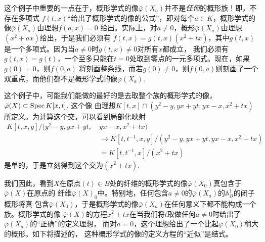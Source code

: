 这个例子中重要的一点在于，概形学式的像$\bar\varphi(X_a)$并不是\textit{任何}的概形族！即，不存在多项式
$f(t,x)$“给出了概形学式的像的公式”，即对每个$a\in K$，概形学式的像$\bar\varphi(X_a)$由理想$f(a,x)=0$
给出。实际上，对$a\neq 0$，概形$\bar\varphi(X_a)$由理想$(x^2+ax)$给出，于是我们必须有
$f(t,x)=g(t,x)(x^2+tx)$，其中$g(t,x)$是一个多项式。因为当$a\neq 0$时$g(t,x)\neq 0$对所有$x$都成立，
我们必须有$g(t,x)=g(t)$，一个至多只能在$t=0$处取到零点的一元多项式。现在，如果$g(0)=0$，则$f(0,a)$
将刻画整条线，而若$g(0)\neq 0$，则$f(0,a)$则刻画了一个双重点，而他们都不是概形学式的像$\bar\varphi(X_a)$.

这个例子中，可能我们能做的最好的是去取整个族的概形学式的像，$\bar\varphi(X)\subset \operatorname{Spec} K[x,t]$. 这个像
由理想$K[t, x] \cap\left(y^2-y, y x+y t, y x-x, x^2+t x\right)$所定义。为计算这个交，可以看到局部化映射
\[
    \begin{aligned}
        K[t, x, y] /(y^2-y, y x+ y t, ~& y x-x, x^2+t x) \\
        & \to K[t, t^{-1}, x, y] /(y^2-y, y x+y t, y x-x, x^2+t x) \\
        & =K[t, t^{-1}, x] /(x^2+t x)
    \end{aligned}
\]
是单的，于是立刻得到这个交为$(x^2+tx)$.

我们因此，看到$X$在原点$(t)\in B$处的纤维的概形学式的像$\bar\varphi(X_0)$真包含于$\bar\varphi(X)$在原点的
纤维$\bar\varphi(X)_0$中。特别地，任何包含$a\neq 0$的$\bar\varphi(X_a)$的$\mathbb A_B^1$的闭子概形将真
包含$\bar\varphi(X_0)$，于是概形学式的像$\bar\varphi(X_a)$在任何意义下都不能构成一个族。概形学式的像
$\bar\varphi(X)$的方程$x^2+tx$在当我们将$t$取做任何$a\neq 0$时给出了$\bar\varphi(X_a)$的“正确”的定义理想，
而对$a=0$，这个理想给出了一个比起$\bar\varphi(X_0)$稍大的概形。如下将描述的，
这种概形学式的像的定义方程的“近似”是结式。

